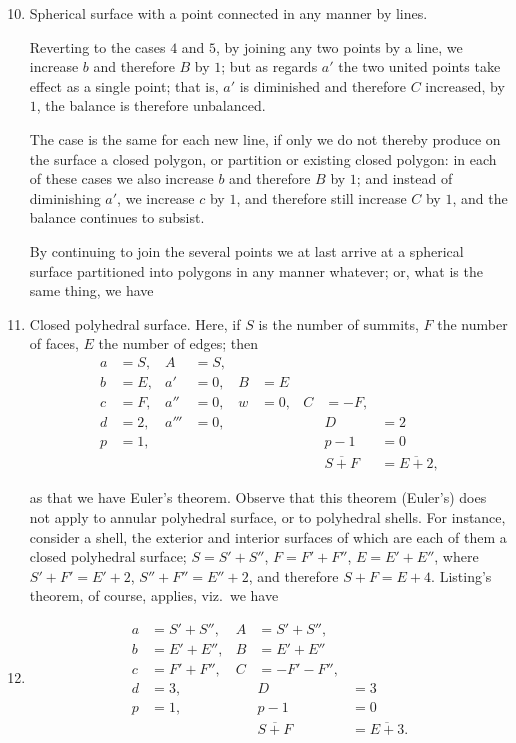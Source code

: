 \documentclass[11pt,a4paper]{article}
\theoremstyle{plain}
\theoremstyle{definition}
\begin{document}
\begin{enumerate}
\setcounter{enumi}{9}
\item Spherical surface with a point connected in any manner by lines.

Reverting to the cases $4$ and $5$, by joining any two points by a line, we increase $b$
and therefore $B$ by $1$; but as regards $a'$ the two united points take effect as a
single point; that is, $a'$ is diminished and therefore $C$ increased, by $1$, the balance
is therefore unbalanced.

The case is the same for each new line, if only we do not thereby produce on
the surface a closed polygon, or partition or existing closed polygon: in each of these
cases we also increase $b$ and therefore $B$ by $1$; and instead of diminishing $a'$, we
increase $c$ by $1$, and therefore still increase $C$ by $1$, and the balance continues to
subsist.

By continuing to join the several points we at last arrive at a spherical surface
partitioned into polygons in any manner whatever; or, what is the same thing,
we have

\item Closed polyhedral surface. Here, if $S$ is the number of summits, $F$ the
number of faces, $E$ the number of edges; then
\begin{align*}
a &= S, & A &= S, \\
b &= E, & a' &= 0, & B &= E \\
c &= F, & a'' &= 0, & w &= 0, & C &= -F, \\
d &= 2, & a''' &= 0, & & & & D &= 2 \\
p &= 1, & & & & & & p - 1 &= 0 \\[2pt]
& & & & & & & \overline{S + F} &= \overline{E + 2},
\end{align*}

as that we have Euler's theorem. Observe that this theorem (Euler's) does not apply
to annular polyhedral surface, or to polyhedral shells. For instance, consider a shell,
the exterior and interior surfaces of which are each of them a closed polyhedral
surface; $S = S' + S''$, $F = F' + F''$, $E = E' + E''$, where
$S' + F' = E' + 2$, $S'' + F'' = E'' + 2$, and therefore
$S + F = E + 4$. Listing's theorem, of course, applies, viz.\ we have

\item
\begin{align*}
a &= S' + S'', & A &= S' + S'', \\
b &= E' + E'', & B &= E' + E'' \\
c &= F' + F'', & C &= -F' - F'', \\
d &= 3, & & D &= 3 \\
p &= 1, & & p - 1 &= 0 \\[2pt]
& & & \overline{S + F} &= \overline{E + 3}.
\end{align*}
\end{enumerate}
\end{document}
